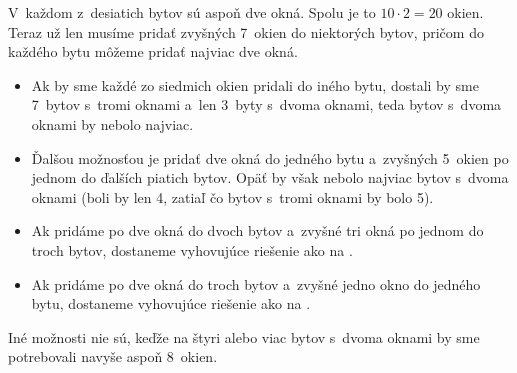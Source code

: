 {\ineriesenie
V~každom z~desiatich bytov sú aspoň dve okná. Spolu je to $10\cdot2=20$ okien. Teraz už len musíme pridať zvyšných 7~okien do niektorých bytov, pričom do každého bytu môžeme pridať najviac dve okná.
\begin{itemize}
  \item Ak by sme každé zo siedmich okien pridali do iného bytu, dostali by sme 7~bytov s~tromi oknami a~len 3~byty s~dvoma oknami, teda bytov s~dvoma oknami by nebolo najviac.
  \item Ďalšou možnosťou je pridať dve okná do jedného bytu a~zvyšných 5~okien po jednom do ďalších piatich bytov. Opäť by však nebolo najviac bytov s~dvoma oknami (boli by len 4, zatiaľ čo bytov s~tromi oknami by bolo 5).
  \item Ak pridáme po dve okná do dvoch bytov a~zvyšné tri okná po jednom do troch bytov, dostaneme vyhovujúce riešenie ako na .
  \item Ak pridáme po dve okná do troch bytov a~zvyšné jedno okno do jedného bytu, dostaneme vyhovujúce riešenie ako na .
\end{itemize}
Iné možnosti nie sú, keďže na štyri alebo viac bytov s~dvoma oknami by sme potrebovali navyše aspoň 8~okien.
}

